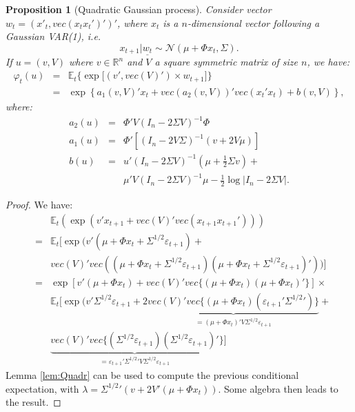 \documentclass[
  12pt,
]{book}
\newtheorem{proposition}{Proposition}[chapter]
\theoremstyle{definition}
\theoremstyle{definition}
\theoremstyle{definition}
\theoremstyle{definition}
\theoremstyle{remark}
\begin{document}
\begin{proposition}[Quadratic Gaussian process]
\protect\hypertarget{prp:QGVAR1}{}\label{prp:QGVAR1}Consider vector \(w_t = (x'_t,vec(x_t x_t')')'\), where \(x_t\) is a \(n\)-dimensional vector following a Gaussian VAR(1), i.e.
\[
x_{t+1}|\underline{w_t} \sim \mathcal{N}(\mu+\Phi x_t, \Sigma).
\]
If \(u = (v,V)\) where \(v \in \mathbb{R}^n\) and \(V\) a square symmetric matrix of size \(n\), we have:
\begin{eqnarray*}
\varphi_t(u) &=& \mathbb{E}_t\big\{\exp\big[(v',vec(V)')\times w_{t+1}\big]\big\} \\
& =& \exp \left\{a_1(v,V)'x_t +vec(a_2(v,V))' vec(x_t'x_t) + b(v,V) \right\},
\end{eqnarray*}
where:
\begin{eqnarray*}
a_2(u) & = & \Phi'V (I_n - 2\Sigma V)^{-1} \Phi \nonumber \\
a_1(u) & = & \Phi'\left[(I_n-2V\Sigma)^{-1}(v+2V\mu)\right] \nonumber \\
b(u) & = & u'(I_n - 2 \Sigma V)^{-1}\left(\mu + \frac{1}{2} \Sigma v\right) +\\
&& \mu'V(I_n - 2 \Sigma V)^{-1}\mu - \frac{1}{2}\log\big|I_n - 2\Sigma V\big|.\label{eq:laplaceZ}
\end{eqnarray*}
\end{proposition}

\begin{proof}
We have:
\begin{eqnarray*}
&&\mathbb{E}_t(\exp(v' x_{t+1} + vec(V)'vec(x_{t+1} x_{t+1}'))) \\
&=& \mathbb{E}_t[\exp(v' (\mu + \Phi x_t + \Sigma^{1/2}\varepsilon_{t+1}) + \\
&& vec(V)'vec((\mu + \Phi x_t + \Sigma^{1/2}\varepsilon_{t+1}) (\mu + \Phi x_t + \Sigma^{1/2}\varepsilon_{t+1})'))] \\
&=& \exp[v' (\mu + \Phi x_t) + vec(V)'vec\{(\mu + \Phi x_t)(\mu + \Phi x_t)'\}] \times \\
&& \mathbb{E}_t[\exp(v'\Sigma^{1/2}\varepsilon_{t+1} +2\underbrace{ vec(V)' vec\{(\mu + \Phi x_t)(\varepsilon_{t+1}'{\Sigma^{1/2}}')\}}_{=(\mu + \Phi x_t)'V\Sigma^{1/2}\varepsilon_{t+1}} +\\
&& \underbrace{vec(V)'vec\{(\Sigma^{1/2}\varepsilon_{t+1})(\Sigma^{1/2}\varepsilon_{t+1})'}_{=\varepsilon_{t+1}'{\Sigma^{1/2}}'V\Sigma^{1/2}\varepsilon_{t+1}}\}]
\end{eqnarray*}
Lemma \ref{lem:Quadr} can be used to compute the previous conditional expectation, with \(\lambda = {\Sigma^{1/2}}'(v + 2 V'(\mu + \Phi x_t))\). Some algebra then leads to the result.
\end{proof}
\end{document}
